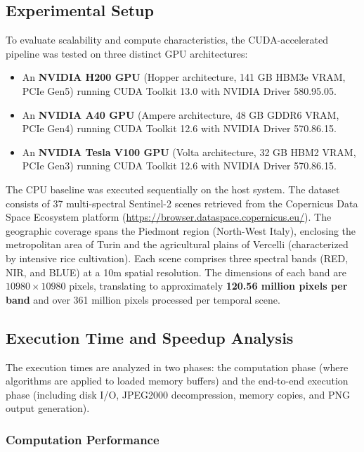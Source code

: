 \documentclass[10pt,conference,compsoc]{IEEEtran}
\begin{document}
\subsection{Experimental Setup}
To evaluate scalability and compute characteristics, the CUDA-accelerated pipeline was tested on three distinct GPU architectures:
\begin{itemize}
    \item An \textbf{NVIDIA H200 GPU} (Hopper architecture, 141 GB HBM3e VRAM, PCIe Gen5) running CUDA Toolkit 13.0 with NVIDIA Driver 580.95.05.
     \item An \textbf{NVIDIA A40 GPU} (Ampere architecture, 48 GB GDDR6 VRAM, PCIe Gen4) running CUDA Toolkit 12.6 with NVIDIA Driver 570.86.15.
    \item An \textbf{NVIDIA Tesla V100 GPU} (Volta architecture, 32 GB HBM2 VRAM, PCIe Gen3) running CUDA Toolkit 12.6 with NVIDIA Driver 570.86.15.
\end{itemize}
The CPU baseline was executed sequentially on the host system.
The dataset consists of 37 multi-spectral Sentinel-2 scenes retrieved from the Copernicus Data Space Ecosystem platform (\url{https://browser.dataspace.copernicus.eu/}). The geographic coverage spans the Piedmont region (North-West Italy), enclosing the metropolitan area of Turin and the agricultural plains of Vercelli (characterized by intensive rice cultivation). Each scene comprises three spectral bands (RED, NIR, and BLUE) at a 10m spatial resolution. The dimensions of each band are $10980 \times 10980$ pixels, translating to approximately \textbf{120.56 million pixels per band} and over 361 million pixels processed per temporal scene.

\subsection{Execution Time and Speedup Analysis}
The execution times are analyzed in two phases: the computation phase (where algorithms are applied to loaded memory buffers) and the end-to-end execution phase (including disk I/O, JPEG2000 decompression, memory copies, and PNG output generation).
\subsubsection{Computation Performance}
\end{document}
